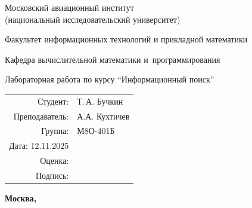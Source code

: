 \begin{titlepage}
\begin{center}
\bfseries

{\Large Московский авиационный институт\\ (национальный исследовательский университет)

}

\vspace{48pt}

{\large Факультет информационных технологий и прикладной математики
}

\vspace{36pt}

{\large Кафедра вычислительной математики и~программирования

}


\vspace{48pt}

Лабораторная работа  по курсу \enquote{Информационный поиск}

\end{center}

\vspace{72pt}

\begin{flushright}
\begin{tabular}{rl}
Студент: & Т.\,А. Бучкин \\
Преподаватель: & А.А. Кухтичев \\
Группа: & М8О-401Б \\
Дата: 12.11.2025& \\
Оценка: & \\
Подпись: & \\
\end{tabular}
\end{flushright}

\vfill

\begin{center}
\bfseries
Москва, \the\year
\end{center}
\end{titlepage}

\pagebreak
